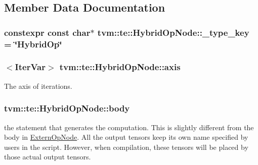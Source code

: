 \subsection{Member Data Documentation}
\subsubsection[{\texorpdfstring{\+\_\+type\+\_\+key}{_type_key}}]{\setlength{\rightskip}{0pt plus 5cm}constexpr const char$\ast$ tvm\+::te\+::\+Hybrid\+Op\+Node\+::\+\_\+type\+\_\+key = \char`\"{}Hybrid\+Op\char`\"{}\hspace{0.3cm}{\ttfamily [static]}}\hypertarget{classtvm_1_1te_1_1HybridOpNode_a6c61dae889fbe0d6d69f9f168e9271e9}{}\label{classtvm_1_1te_1_1HybridOpNode_a6c61dae889fbe0d6d69f9f168e9271e9}
\subsubsection[{\texorpdfstring{axis}{axis}}]{$<${\bf Iter\+Var}$>$ tvm\+::te\+::\+Hybrid\+Op\+Node\+::axis}\hypertarget{classtvm_1_1te_1_1HybridOpNode_ac4fae56982073412415765d9016c3dbd}{}\label{classtvm_1_1te_1_1HybridOpNode_ac4fae56982073412415765d9016c3dbd}


The axis of iterations. 

\subsubsection[{\texorpdfstring{body}{body}}]{ tvm\+::te\+::\+Hybrid\+Op\+Node\+::body}\hypertarget{classtvm_1_1te_1_1HybridOpNode_a77124ad0787c8325f9ba556acdb62feb}{}\label{classtvm_1_1te_1_1HybridOpNode_a77124ad0787c8325f9ba556acdb62feb}


the statement that generates the computation. This is slightly different from the body in \hyperlink{classtvm_1_1te_1_1ExternOpNode}{Extern\+Op\+Node}. All the output tensors keep its own name specified by users in the script. However, when compilation, these tensors will be placed by those actual output tensors. 

